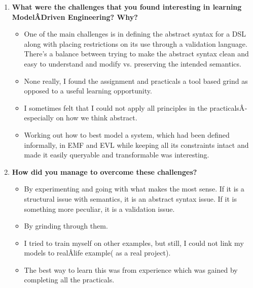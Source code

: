 \documentclass[12pt, a4paper]{report} \usepackage[titletoc]{appendix}
\begin{document}
\begin{appendices}
\begin{enumerate}
\item \textbf{ What were the challenges that you found interesting in learning ModelÂ­Driven Engineering? Why?}
\begin{itemize}
\item One of the main challenges is in defining the abstract syntax for a DSL along with placing restrictions on its use through a validation language. There's a balance between trying to make the abstract syntax clean and easy to understand and modify vs. preserving the intended semantics.
\item None really, I found the assignment and practicals a tool based grind as opposed to a useful learning opportunity.
\item I sometimes felt that I could not apply all principles in the practicalsÂ­ especially on how we think abstract.
\item Working out how to best model a system, which had been defined informally, in EMF and EVL while keeping all its constraints intact and made it easily queryable and transformable was interesting.
\end{itemize}



\item \textbf{How did you manage to overcome these challenges?}
\begin{itemize}
\item By experimenting and going with what makes the most sense. If it is a structural issue with semantics, it is an abstract syntax issue. If it is something more peculiar, it is a validation issue.
\item By grinding through them.
\item I tried to train myself on other examples, but still, I could not link my models to realÂ­life example( as a real project). 
\item The best way to learn this was from experience which was gained by completing all the practicals.
\end{itemize}



\end{enumerate}
\end{appendices}
\end{document}
